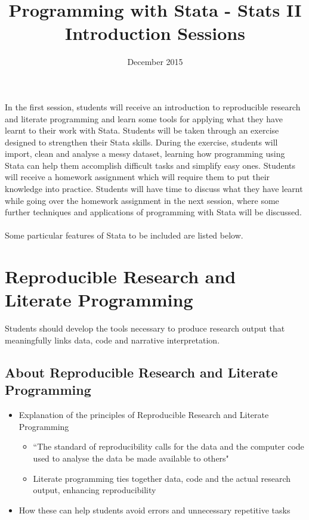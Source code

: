 \documentclass{scrartcl}
\begin{document}
	\title{Programming with Stata - Stats II Introduction Sessions}
	\date{December 2015}
	
	\maketitle 
	
\noindent In the first session, students will receive an introduction to reproducible research and literate programming and learn some tools for applying what they have learnt to their work with Stata. Students will be taken through an exercise designed to strengthen their Stata skills. During the exercise, students will import, clean and analyse a messy dataset, learning how programming using Stata can help them accomplish difficult tasks and simplify easy ones. Students will receive a homework assignment which will require them to put their knowledge into practice. Students will have time to discuss what they have learnt while going over the homework assignment in the next session, where some further techniques and applications of programming with Stata will be discussed.\\~\\
Some particular features of Stata to be included are listed below. 
	
\section{Reproducible Research and Literate Programming}
Students should develop the tools necessary to produce research output that meaningfully links data, code and narrative interpretation.
\subsection{About Reproducible Research and Literate Programming}
\begin{itemize}
  \item Explanation of the principles of Reproducible Research and Literate Programming
  \begin{itemize}
    \item ``The standard of reproducibility calls for the data and the computer code used to analyse the data be made available to others" \cite{peng}
    \item Literate programming ties together data, code and the actual research output, enhancing reproducibility
  \end{itemize}
  \item How these can help students avoid errors and unnecessary repetitive tasks
  
\end{itemize}
\end{document}
